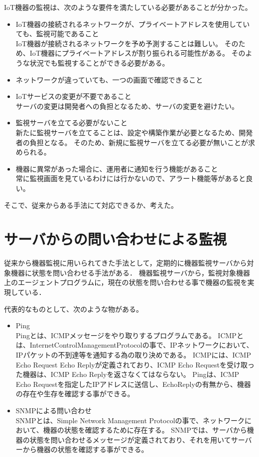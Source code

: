 IoT機器の監視は、次のような要件を満たしている必要があることが分かった。
\begin{itemize}
\item IoT機器の接続されるネットワークが、プライベートアドレスを使用していても、監視可能であること\\
	IoT機器が接続されるネットワークを予め予測することは難しい。
	そのため、IoT機器にプライベートアドレスが割り振られる可能性がある。
	そのような状況でも監視することができる必要がある。
\item ネットワークが違っていても、一つの画面で確認できること\\
\item IoTサービスの変更が不要であること\\
	サーバの変更は開発者への負担となるため、サーバの変更を避けたい。
\item 監視サーバを立てる必要がないこと\\
	新たに監視サーバを立てることは、設定や構築作業が必要となるため、開発者の負担となる。
	そのため、新規に監視サーバを立てる必要が無いことが求められる。
\item 機器に異常があった場合に、運用者に通知を行う機能があること\\
	常に監視画面を見ているわけには行かないので、アラート機能等があると良い。
\end{itemize}

そこで、従来からある手法にて対応できるか、考えた。
\section{サーバからの問い合わせによる監視}
	従来から機器監視に用いられてきた手法として，定期的に機器監視サーバから対象機器に状態を問い合わせる手法がある．
	機器監視サーバから，監視対象機器上のエージェントプログラムに，現在の状態を問い合わせる事で機器の監視を実現している．
	\medskip

	代表的なものとして、次のような物がある。
	\begin{itemize}
		\item Ping\\
			Pingとは、ICMPメッセージをやり取りするプログラムである。
			ICMPとは、InternetControlManagementProtocolの事で、IPネットワークにおいて、IPパケットの不到達等を通知する為の取り決めである。
			ICMPには、ICMP Echo Request Echo Replyが定義されており、ICMP Echo Requestを受け取った機器は、ICMP Echo Replyを返さなくてはならない。
			Pingは、ICMP Echo Requestを指定したIPアドレスに送信し、EchoReplyの有無から、機器の存在や生存を確認する事ができる。
		\item SNMPによる問い合わせ\\
			SNMPとは、Simple Network Management Protocolの事で、ネットワークにおいて、機器の状態を確認するために存在する。
			SNMPでは、サーバから機器の状態を問い合わせるメッセージが定義されており、それを用いてサーバーから機器の状態を確認する事ができる。
	\end{itemize}
	
